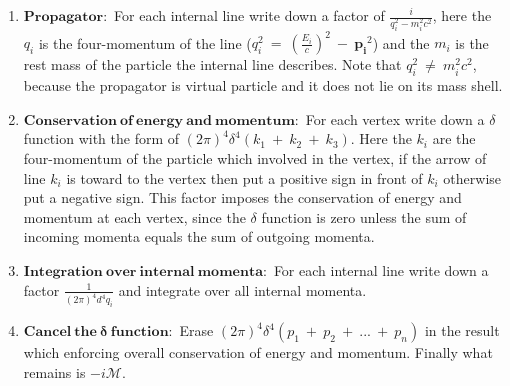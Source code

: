 \begin{enumerate}
\item $\mathbf{Propagator:}$ For each internal line write down a factor of $\frac{i}{q^{2}_{i}-m_{i}^{2}c^{2}}$, here the $q_{i}$ is the four-momentum of the line ($q_{i}^{2}~=~(\frac{E_{i}}{c})^{2}~-~\mathbf{p_{i}}^{2}$) and the $m_{i}$ is the rest mass of the particle the internal line describes. Note that $q_{i}^{2}~\neq~m_{i}^{2}c^{2}$, because the propagator is virtual particle and it does not lie on its mass shell.
\item $\mathbf{Conservation~of~energy~and~momentum:}$ For each vertex write down a $\delta$ function with the form of $(2\pi)^{4}\delta^{4}(k_{1}~+~k_{2}~+~k_{3})$. Here the $k_{i}$ are the four-momentum of the particle which involved in the vertex, if the arrow of line $k_{i}$ is toward to the vertex then put a positive sign in front of $k_{i}$ otherwise put a negative sign. This factor imposes the conservation of energy and momentum at each vertex, since the $\delta$ function is zero unless the sum of incoming momenta equals the sum of outgoing momenta.
\item $\mathbf{Integration~over~internal~momenta:}$ For each internal line write down a factor $\frac{1}{(2\pi)^{4}d^{4}q_{i}}$ and integrate over all internal momenta.
\item $\mathbf{Cancel~the~\delta~function:}$ Erase $(2\pi)^{4}\delta^{4}(p_{1}~+~p_{2}~+~...~+~p_{n})$ in the result which enforcing overall conservation of energy and momentum. Finally what remains is $-i\mathcal{M}$.
\end{enumerate}


